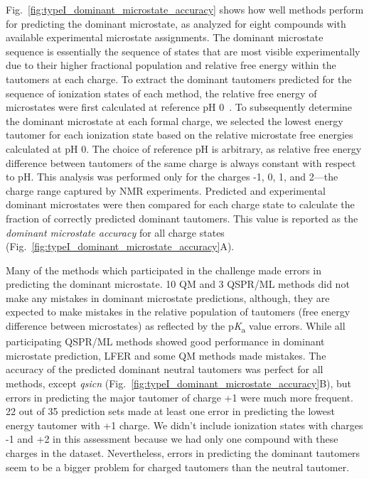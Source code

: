 \documentclass[9pt,lineno,final]{elife}
\newcommand{\pKa}{p\textit{K}\textsubscript{a}}
\begin{document}
Fig.~\ref{fig:typeI_dominant_microstate_accuracy} shows how well methods perform for predicting the dominant microstate, as analyzed for eight compounds with available experimental microstate assignments.
The dominant microstate sequence is essentially the sequence of states that are most visible experimentally due to their higher fractional population and relative free energy within the tautomers at each charge.
To extract the dominant tautomers predicted for the sequence of ionization states of each method, the relative free energy of microstates were first calculated at reference pH 0~\citep{Gunner:2020:J.Comput.AidedMol.Des.}. 
To subsequently determine the dominant microstate at each formal charge, we selected the lowest energy tautomer for each ionization state based on the relative microstate free energies calculated at pH 0. 
The choice of reference pH is arbitrary, as relative free energy difference between tautomers of the same charge is always constant with respect to pH. 
This analysis was performed only for the charges -1, 0, 1, and 2---the charge range captured by NMR experiments.
Predicted and experimental dominant microstates were then compared for each charge state to calculate the fraction of correctly predicted dominant tautomers. 
This value is reported as the \emph{dominant microstate accuracy} for all charge states (Fig.~\ref{fig:typeI_dominant_microstate_accuracy}A). 

Many of the methods which participated in the challenge made errors in predicting the dominant microstate. 
10 QM and 3 QSPR/ML methods did not make any mistakes in dominant microstate predictions, although, they are expected to make mistakes in the relative population of tautomers (free energy difference between microstates) as reflected by the \pKa{} value errors. 
While all participating QSPR/ML methods showed good performance in dominant microstate prediction, LFER and some QM methods made mistakes. 
The accuracy of the predicted dominant neutral tautomers was perfect for all methods, except \textit{qsicn} (Fig.~\ref{fig:typeI_dominant_microstate_accuracy}B), but errors in predicting the major tautomer of charge +1 were much more frequent. 
22 out of 35 prediction sets made at least one error in predicting the lowest energy tautomer with +1 charge. 
We didn't include ionization states with charges -1 and +2 in this assessment because we had only one compound with these charges in the dataset. 
Nevertheless, errors in predicting the dominant tautomers seem to be a bigger problem for charged tautomers than the neutral tautomer.    
\end{document}
